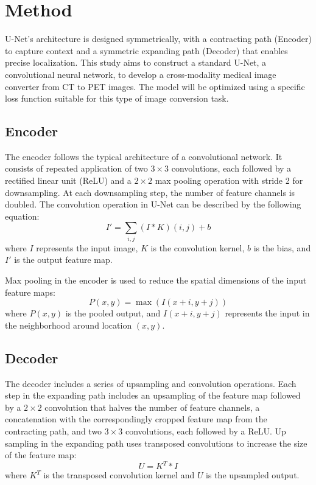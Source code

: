 \documentclass[twocolumn]{article}
\begin{document}
\section{Method}
U-Net's architecture is designed symmetrically, with a contracting path (Encoder) to capture context and a symmetric expanding path (Decoder) that enables precise localization. This study aims to construct a standard U-Net, a convolutional neural network, to develop a cross-modality medical image converter from CT to PET images. The model will be optimized using a specific loss function suitable for this type of image conversion task.

\subsection{Encoder}
The encoder follows the typical architecture of a convolutional network. It consists of repeated application of two $3\times3$ convolutions, each followed by a rectified linear unit (ReLU) and a $2\times2$ max pooling operation with stride 2 for downsampling. At each downsampling step, the number of feature channels is doubled. The convolution operation in U-Net can be described by the following equation:
\[
I' = \sum_{i,j} (I * K)(i,j) + b
\]
where \(I\) represents the input image, \(K\) is the convolution kernel, \(b\) is the bias, and \(I'\) is the output feature map.

Max pooling in the encoder is used to reduce the spatial dimensions of the input feature maps:
\[
P(x,y) = \max(I(x + i, y + j))
\]
where \(P(x,y)\) is the pooled output, and \(I(x + i, y + j)\) represents the input in the neighborhood around location \((x, y)\).



\subsection{Decoder}
The decoder includes a series of upsampling and convolution operations. Each step in the expanding path includes an upsampling of the feature map followed by a $2\times2$ convolution that halves the number of feature channels, a concatenation with the correspondingly cropped feature map from the contracting path, and two $3\times3$ convolutions, each followed by a ReLU. Up sampling in the expanding path uses transposed convolutions to increase the size of the feature map:
\[
U = K^T * I
\]
where \(K^T\) is the transposed convolution kernel and \(U\) is the upsampled output.
\end{document}

